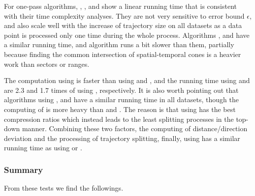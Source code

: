 For one-pass algorithms, \operb, \siped, \cised and \interval show a linear running time that is consistent with their time complexity analyses. They are not very sensitive to error bound $\epsilon$, and also scale well with the increase of trajectory size on all datasets as a data point is processed only one time during the whole process.
Algorithms \siped, \operb and \interval have a similar running time, and algorithm \cised runs a bit slower than them, partially because finding the common intersection of spatial-temporal cones is a heavier work than sectors or ranges.


The computation using \dad is faster than using \ped and \sed, and the running time using \ped and \sed are 2.3 and 1.7 times of using \dad, respectively.
{It is also worth pointing out that algorithms \dpa using \ped, \sed and \dad have a similar running time in all datasets, though the computing of \ped is more heavy than \sed and \dad. The reason is that \dpa using \ped has the best compression ratios which instead leads to the least splitting processes in the top-down manner. Combining these two factors, \ie the computing of distance/direction deviation and the processing of trajectory splitting, finally, \dpa using \ped has a similar running time as \dpa using \dad or \sed.}




\subsubsection{Summary}
From these tests we find the followings.


